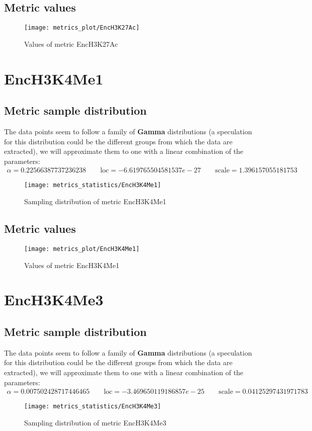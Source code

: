 \subsection{Metric values}
\begin{figure}
	\texttt{[image: metrics\_plot/EncH3K27Ac]}
	\caption{Values of metric EncH3K27Ac}
\end{figure}

\clearpage
\section{EncH3K4Me1}
\subsection{Metric sample distribution}
The data points seem to follow a family of \textbf{Gamma} distributions (a speculation for this distribution could be the different groups from which the data are extracted), we will approximate them to one with a linear combination of the parameters:
\begin{align*}
	\alpha   = 0.22566387737236238    \qquad  \text{loc} = -6.619765504581537e-27 \qquad \text{scale} = 1.396157055181753
\end{align*}
\begin{figure}
	\texttt{[image: metrics\_statistics/EncH3K4Me1]}
	\caption{Sampling distribution of metric EncH3K4Me1}
\end{figure}
\subsection{Metric values}
\begin{figure}
	\texttt{[image: metrics\_plot/EncH3K4Me1]}
	\caption{Values of metric EncH3K4Me1}
\end{figure}

\clearpage
\section{EncH3K4Me3}
\subsection{Metric sample distribution}
The data points seem to follow a family of \textbf{Gamma} distributions (a speculation for this distribution could be the different groups from which the data are extracted), we will approximate them to one with a linear combination of the parameters:
\begin{align*}
	\alpha   = 0.007502428717446465    \qquad  \text{loc} = -3.469650119186857e-25 \qquad \text{scale} = 0.04125297431971783
\end{align*}
\begin{figure}
	\texttt{[image: metrics\_statistics/EncH3K4Me3]}
	\caption{Sampling distribution of metric EncH3K4Me3}
\end{figure}
